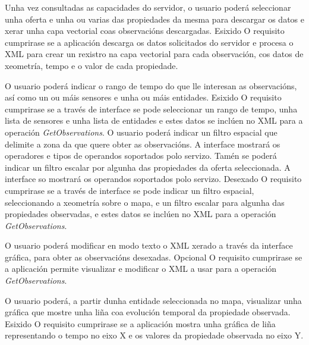 		  	{Unha vez consultadas as capacidades do servidor, o usuario poderá seleccionar unha oferta e unha ou varias das propiedades da mesma para descargar os datos e xerar unha capa vectorial coas observacións descargadas.}%
			{Esixido}%
			{O requisito cumprirase se a aplicación descarga os datos solicitados do servidor e procesa o XML para crear un rexistro na capa vectorial para cada observación, cos datos de xeometría, tempo e o valor de cada propiedade.}%

		  	{O usuario poderá indicar o rango de tempo do que lle interesan as observacións, así como un ou máis sensores e unha ou máis entidades.}%
			{Esixido}%
			{O requisito cumprirase se a través de interface se pode seleccionar un rango de tempo, unha lista de sensores e unha lista de entidades e estes datos se inclúen no XML para a operación \emph{GetObservations}.}%
\newpage			
{}
		  	{O usuario poderá indicar un filtro espacial que delimite a zona da que quere obter as observacións. A interface mostrará os operadores e tipos de operandos soportados polo servizo. Tamén se poderá indicar un filtro escalar por algunha das propiedades da oferta seleccionada. A interface so mostrará os operandos soportados polo servizo.}%
			{Desexado}%
			{O requisito cumprirase se a través de interface se pode indicar un filtro espacial, seleccionando a xeometría sobre o mapa, e un filtro escalar para algunha das propiedades observadas, e estes datos se inclúen no XML para a operación \emph{GetObservations}.}%
			
		  	{O usuario poderá modificar en modo texto o XML xerado a través da interface gráfica,  para obter as observacións desexadas.}%
			{Opcional}%
			{O requisito cumprirase se a aplicación permite visualizar e modificar o XML a usar para a operación \emph{GetObservations}.}%
			
		  	{O usuario poderá, a partir dunha entidade seleccionada no mapa, visualizar unha gráfica que mostre unha liña coa evolución temporal da propiedade observada.}%
			{Esixido}%
			{O requisito cumprirase se a aplicación mostra unha gráfica de liña representando o tempo no eixo X e os valores da propiedade observada no eixo Y.}%
			
